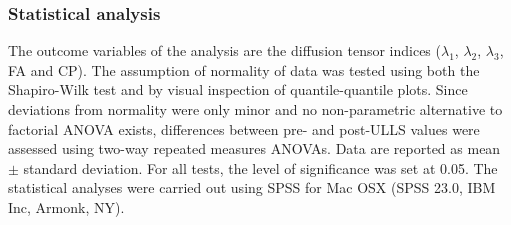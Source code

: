 \subsubsection{Statistical analysis} 
The outcome variables of the analysis are the diffusion tensor indices ($\lambda_1$, $\lambda_2$, $\lambda_3$, FA and CP). 
The assumption of normality of data was tested using both the Shapiro-Wilk test and by visual inspection of quantile-quantile plots. 
Since deviations from normality were only minor and no non-parametric alternative to factorial ANOVA exists, differences between pre- and post-ULLS values were assessed using two-way repeated measures ANOVAs. 
Data are reported as mean $\pm$ standard deviation. 
For all tests, the level of significance was set at 0.05. 
The statistical analyses were carried out using SPSS for Mac OSX (SPSS 23.0, IBM Inc, Armonk, NY).
